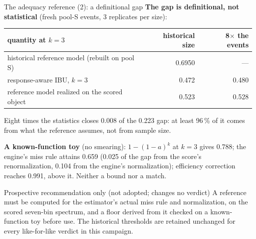 \documentclass[aspectratio=169,10pt]{beamer}
\def\evidencetext{}
\begin{document}
\gdef\evidencetext{\texttt{phase\_e/results/reference\_assessment.json}; \texttt{phase\_e/results/toy\_reference.json}}
\begin{frame}{The adequacy reference (2): a definitional gap}
{\small \textbf{The gap is definitional, not statistical} (fresh pool-S events, 3 replicates per size):}
\begin{center}
{\footnotesize
\begin{tabular}{lrr}
\toprule
quantity at $k=3$ & historical size & 8$\times$ the events \\
\midrule
historical reference model (rebuilt on pool S) & 0.6950 & --- \\
response-aware IBU, $k=3$ & 0.472 & 0.480 \\
reference model realized on the scored object & 0.523 & 0.528 \\
\bottomrule
\end{tabular}}
\end{center}
{\small Eight times the statistics closes 0.008 of the 0.223 gap: at least
96\,\% of it comes from what the reference assumes, not from sample size.\par\vspace{4pt}
\textbf{A known-function toy} (no smearing): $1-(1-a)^k$ at $k=3$ gives 0.788; the engine's miss rule
attains 0.659 (0.025 of the gap from the score's renormalization, 0.104 from the
engine's normalization); efficiency correction reaches 0.991, above it. Neither a bound nor a match.}
\begin{block}{Prospective recommendation only (not adopted; changes no verdict)}
\small A reference must be computed for the estimator's actual miss rule and normalization, on the scored
seven-bin spectrum, and a floor derived from it checked on a known-function toy before use. The historical
thresholds are retained unchanged for every like-for-like verdict in this campaign.
\end{block}
\end{frame}
\end{document}
